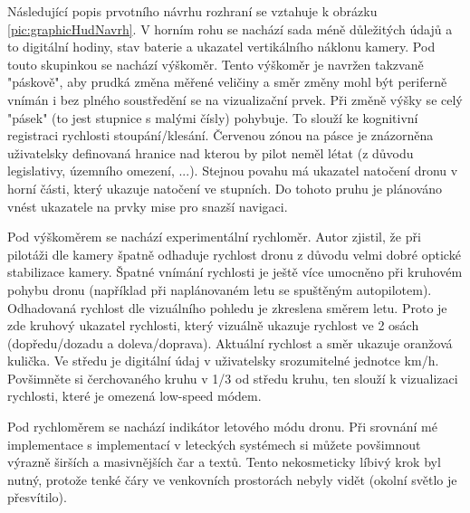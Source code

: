 Následující popis prvotního návrhu rozhraní se vztahuje k obrázku \ref{pic:graphicHudNavrh}. V horním rohu se nachází sada méně důležitých údajů a to digitální hodiny, stav baterie a ukazatel vertikálního náklonu kamery. Pod touto skupinkou se nachází výškoměr. Tento výškoměr je navržen takzvaně "páskově", aby  prudká změna měřené veličiny a směr změny mohl být periferně vnímán i bez plného soustředění se na vizualizační prvek. Při změně výšky se celý "pásek" (to jest stupnice s malými čísly) pohybuje. To slouží ke kognitivní registraci rychlosti stoupání/klesání. Červenou zónou na pásce je znázorněna uživatelsky definovaná hranice nad kterou by pilot neměl létat (z důvodu legislativy, územního omezení, ...). Stejnou povahu má ukazatel natočení dronu v horní části, který ukazuje natočení ve stupních. Do tohoto pruhu je plánováno vnést ukazatele na prvky mise pro snazší navigaci.

Pod výškoměrem se nachází experimentální rychloměr. Autor zjistil, že při pilotáži dle kamery špatně odhaduje rychlost dronu z důvodu velmi dobré optické stabilizace kamery. Špatné vnímání rychlosti je ještě více umocněno při kruhovém pohybu dronu (například při naplánovaném letu se spuštěným autopilotem). Odhadovaná rychlost dle vizuálního pohledu je zkreslena směrem letu. Proto je zde kruhový ukazatel rychlosti, který vizuálně ukazuje rychlost ve 2 osách (dopředu/dozadu a doleva/doprava). Aktuální rychlost a směr ukazuje oranžová kulička. Ve středu je digitální údaj v uživatelsky srozumitelné jednotce km/h. Povšimněte si čerchovaného kruhu v 1/3 od středu kruhu, ten slouží k vizualizaci rychlosti, které je omezená low-speed módem.

Pod rychloměrem se nachází indikátor letového módu dronu. Při srovnání mé implementace s implementací v leteckých systémech si můžete povšimnout výrazně širších a masivnějších čar a textů. Tento nekosmeticky líbivý krok byl nutný, protože tenké čáry ve venkovních prostorách nebyly vidět (okolní světlo je přesvítilo).


